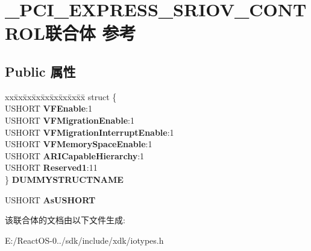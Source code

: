 \hypertarget{union___p_c_i___e_x_p_r_e_s_s___s_r_i_o_v___c_o_n_t_r_o_l}{}\section{\+\_\+\+P\+C\+I\+\_\+\+E\+X\+P\+R\+E\+S\+S\+\_\+\+S\+R\+I\+O\+V\+\_\+\+C\+O\+N\+T\+R\+O\+L联合体 参考}
\label{union___p_c_i___e_x_p_r_e_s_s___s_r_i_o_v___c_o_n_t_r_o_l}
\subsection*{Public 属性}
\begin{DoxyCompactItemize}
\item 
\mbox{\label{union___p_c_i___e_x_p_r_e_s_s___s_r_i_o_v___c_o_n_t_r_o_l_a2daeefbe30600ce21a0b68a51f9fb236}} 
\begin{tabbing}
xx\=xx\=xx\=xx\=xx\=xx\=xx\=xx\=xx\=\kill
struct \{\\
\>USHORT {\bfseries VFEnable}:1\\
\>USHORT {\bfseries VFMigrationEnable}:1\\
\>USHORT {\bfseries VFMigrationInterruptEnable}:1\\
\>USHORT {\bfseries VFMemorySpaceEnable}:1\\
\>USHORT {\bfseries ARICapableHierarchy}:1\\
\>USHORT {\bfseries Reserved1}:11\\
\} {\bfseries DUMMYSTRUCTNAME}\\

\end{tabbing}\item 
\mbox{\label{union___p_c_i___e_x_p_r_e_s_s___s_r_i_o_v___c_o_n_t_r_o_l_aabe45329ca8be76004485a49e9b8b1b7}} 
U\+S\+H\+O\+RT {\bfseries As\+U\+S\+H\+O\+RT}
\end{DoxyCompactItemize}


该联合体的文档由以下文件生成\+:\begin{DoxyCompactItemize}
\item 
E\+:/\+React\+O\+S-\/0../sdk/include/xdk/iotypes.\+h\end{DoxyCompactItemize}
